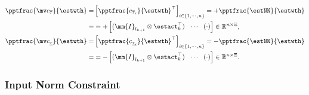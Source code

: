 \documentclass[lettersize,journal]{IEEEtran}
\begin{document}
\begin{equation}
    \begin{aligned}
        \pptfrac{\mv c_{\overline \tau}}{\estwth}
        =& 
        \left[
            \pptfrac{c_{\overline \tau_i}}{\estwth}^\top
        \right]_{i\in\{1,\cdots,n\}}
        = 
            +\pptfrac{\estNN}{\estwth}
            \\
        =&
        =
        +
        \begin{bmatrix}
            (\mm{I}_{l_{k+1}}\otimes \estact_{k}^\top)&
            \!\cdots\! &
            (
                \cdot
            )
        \end{bmatrix} 
        \in
        \mathbb R^{n\times \Xi}
        , 
        \\
        \pptfrac{\mv c_{\underline\tau}}{\estwth}         
        =
        & 
        \left[
            \pptfrac{c_{\underline\tau_i}}{\estwth}^\top
        \right]_{i\in\{1,\cdots,n\}}
        = 
        -\pptfrac{\estNN}{\estwth}
        \\
        =&
        =
        -\begin{bmatrix}
            (\mm{I}_{l_{k+1}}\otimes \estact_{k}^\top)&
            \!\cdots\! &
            (
                \cdot
            )
        \end{bmatrix} 
        \in
        \mathbb R^{n\times \Xi}
        .
    \end{aligned}
    \label{eq:cstr:input:bound:grad}
\end{equation}

\subsubsection{Input Norm Constraint}\label{sec:appen:cstr:input:norm}
\end{document}
